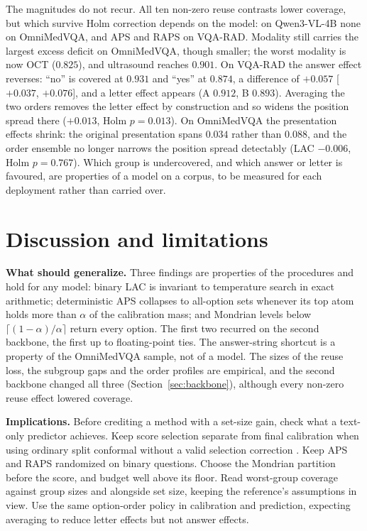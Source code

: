 \documentclass[a4paper,conference]{IEEEtran}
\newcommand{\rtag}[1]{}
\begin{document}
The magnitudes do not recur. All ten non-zero reuse contrasts lower coverage,
but which survive Holm correction depends on the model: on Qwen3-VL-4B none on
OmniMedVQA, and APS and RAPS on VQA-RAD. Modality still carries the largest
excess deficit on OmniMedVQA, though smaller; the worst modality is now OCT
($0.825$), and ultrasound reaches $0.901$. On VQA-RAD the answer effect
reverses: ``no'' is covered at $0.931$ and ``yes'' at $0.874$, a difference
of $+0.057$ [$+0.037$, $+0.076$], and a letter effect appears (A $0.912$, B
$0.893$). Averaging the two orders removes the letter effect by construction
and so widens the position spread there ($+0.013$, Holm $p=0.013$). On
OmniMedVQA the presentation effects shrink: the original presentation spans
$0.034$ rather than $0.088$, and the order ensemble no longer narrows the
position spread detectably (LAC $-0.006$, Holm $p=0.767$).
Which group is undercovered, and which answer or letter is favoured, are
properties of a model on a corpus, to be measured for each deployment rather
than carried over.

\section{Discussion and limitations}\label{sec:discussion}

\textbf{What should generalize.} Three findings are properties of the
procedures and hold for any model: binary LAC is invariant to temperature
search in exact arithmetic; deterministic APS collapses to all-option sets
whenever its top atom holds more than $\alpha$ of the calibration mass; and
Mondrian levels below $\lceil(1-\alpha)/\alpha\rceil$ return every option. The
first two recurred on the second backbone, the first up to floating-point
ties. The answer-string shortcut is a property of the OmniMedVQA sample, not of
a model. The sizes of the reuse loss, the subgroup gaps and the order profiles
are empirical, and the second backbone changed all three
(Section~\ref{sec:backbone}), although every non-zero reuse effect lowered
coverage.\rtag{R1.4}

\textbf{Implications.} Before crediting a method with a set-size gain, check
what a text-only predictor achieves. Keep score selection separate from final
calibration when using ordinary split conformal without a valid selection
correction \cite{liang2024selection}. Keep APS and RAPS randomized on binary
questions. Choose the Mondrian partition before the score, and budget well
above its floor. Read worst-group coverage against group sizes and alongside
set size, keeping the reference's assumptions in view. Use the same
option-order policy in calibration and prediction, expecting averaging to
reduce letter effects but not answer effects.
\end{document}

